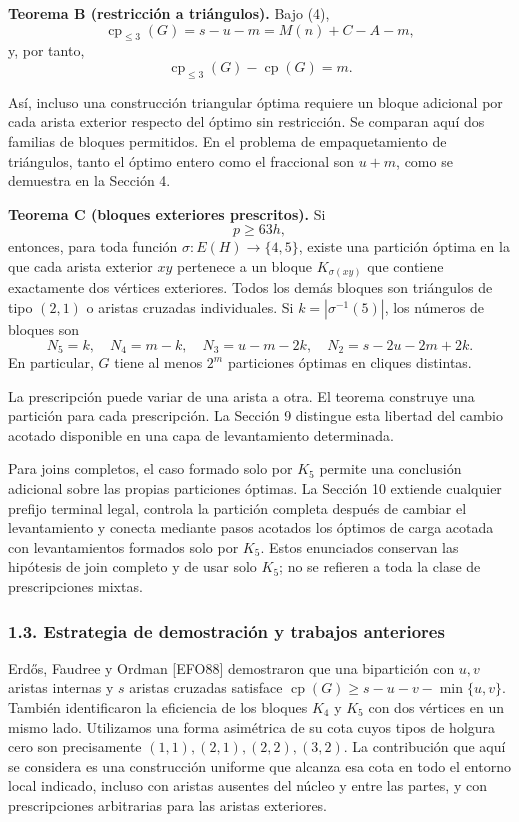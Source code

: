 \documentclass[spanish,11pt,a4paper]{article}
\begin{document}
\textbf{Teorema B (restricción a triángulos).} Bajo (4), \[
\operatorname{cp}_{\le3}(G)=s-u-m=M(n)+C-A-m, \tag{6}
\] y, por tanto, \[
\operatorname{cp}_{\le3}(G)-\operatorname{cp}(G)=m. \tag{7}
\]

Así, incluso una construcción triangular óptima requiere un bloque
adicional por cada arista exterior respecto del óptimo sin restricción.
Se comparan aquí dos familias de bloques permitidos. En el problema de
empaquetamiento de triángulos, tanto el óptimo entero como el fraccional
son \(u+m\), como se demuestra en la Sección 4.

\textbf{Teorema C (bloques exteriores prescritos).} Si \[
p\ge63h, \tag{8}
\] entonces, para toda función \(\sigma:E(H)\to\{4,5\}\), existe una
partición óptima en la que cada arista exterior \(xy\) pertenece a un
bloque \(K_{\sigma(xy)}\) que contiene exactamente dos vértices
exteriores. Todos los demás bloques son triángulos de tipo \((2,1)\) o
aristas cruzadas individuales. Si \(k=|\sigma^{-1}(5)|\), los números de
bloques son \[
N_5=k,\quad N_4=m-k,\quad N_3=u-m-2k,
\quad N_2=s-2u-2m+2k. \tag{9}
\] En particular, \(G\) tiene al menos \(2^m\) particiones óptimas en
cliques distintas.

La prescripción puede variar de una arista a otra. El teorema construye
una partición para cada prescripción. La Sección 9 distingue esta
libertad del cambio acotado disponible en una capa de levantamiento
determinada.

Para joins completos, el caso formado solo por \(K_5\) permite una
conclusión adicional sobre las propias particiones óptimas. La Sección
10 extiende cualquier prefijo terminal legal, controla la partición
completa después de cambiar el levantamiento y conecta mediante pasos
acotados los óptimos de carga acotada con levantamientos formados solo
por \(K_5\). Estos enunciados conservan las hipótesis de join completo y
de usar solo \(K_5\); no se refieren a toda la clase de prescripciones
mixtas.

\subsubsection{1.3. Estrategia de demostración y trabajos
anteriores}\label{estrategia-de-demostraciuxf3n-y-trabajos-anteriores}

Erdős, Faudree y Ordman {[}EFO88{]} demostraron que una bipartición con
\(u,v\) aristas internas y \(s\) aristas cruzadas satisface
\(\operatorname{cp}(G)\ge s-u-v-\min\{u,v\}\). También identificaron la
eficiencia de los bloques \(K_4\) y \(K_5\) con dos vértices en un mismo
lado. Utilizamos una forma asimétrica de su cota cuyos tipos de holgura
cero son precisamente \((1,1),(2,1),(2,2),(3,2)\). La contribución que
aquí se considera es una construcción uniforme que alcanza esa cota en
todo el entorno local indicado, incluso con aristas ausentes del núcleo
y entre las partes, y con prescripciones arbitrarias para las aristas
exteriores.
\end{document}

